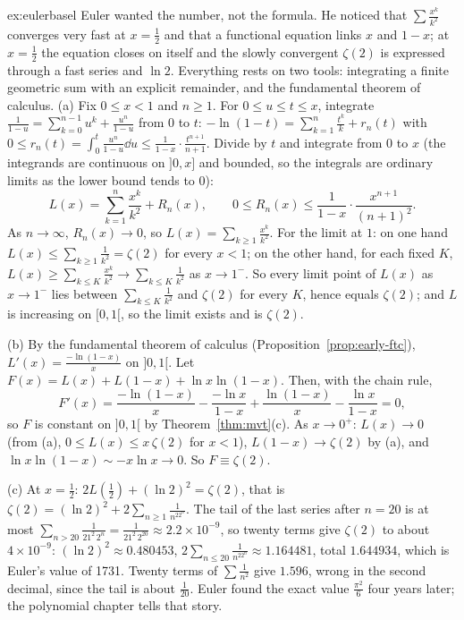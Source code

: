\begin{solution}{ex:eulerbasel}
\idea Euler wanted the number, not the formula. He noticed that $\sum\frac{x^k}{k^2}$ converges very fast at $x=\frac12$ and that a functional equation links $x$ and $1-x$; at $x=\frac12$ the equation closes on itself and the slowly convergent $\zeta(2)$ is expressed through a fast series and $\ln2$. Everything rests on two tools: integrating a finite geometric sum with an explicit remainder, and the fundamental theorem of calculus.
\writeup (a) Fix $0\le x<1$ and $n\ge1$. For $0\le u\le t\le x$, integrate $\frac1{1-u}=\sum_{k=0}^{n-1}u^k+\frac{u^n}{1-u}$ from $0$ to $t$:
$-\ln(1-t)=\sum_{k=1}^n\frac{t^k}k+r_n(t)$ with $0\le r_n(t)=\int_0^t\frac{u^n}{1-u}\dd u\le\frac1{1-x}\cdot\frac{t^{n+1}}{n+1}$.
Divide by $t$ and integrate from $0$ to $x$ (the integrands are continuous on $]0,x]$ and bounded, so the integrals are ordinary limits as the lower bound tends to $0$):
\[
L(x)=\sum_{k=1}^n\frac{x^k}{k^2}+R_n(x),\qquad0\le R_n(x)\le\frac1{1-x}\cdot\frac{x^{n+1}}{(n+1)^2}.
\]
As $n\to\infty$, $R_n(x)\to0$, so $L(x)=\sum_{k\ge1}\frac{x^k}{k^2}$. For the limit at $1$: on one hand $L(x)\le\sum_{k\ge1}\frac1{k^2}=\zeta(2)$ for every $x<1$; on the other hand, for each fixed $K$, $L(x)\ge\sum_{k\le K}\frac{x^k}{k^2}\to\sum_{k\le K}\frac1{k^2}$ as $x\to1^-$. So every limit point of $L(x)$ as $x\to1^-$ lies between $\sum_{k\le K}\frac1{k^2}$ and $\zeta(2)$ for every $K$, hence equals $\zeta(2)$; and $L$ is increasing on $[0,1[$, so the limit exists and is $\zeta(2)$.

(b) By the fundamental theorem of calculus (Proposition~\ref{prop:early-ftc}), $L'(x)=\frac{-\ln(1-x)}x$ on $]0,1[$. Let $F(x)=L(x)+L(1-x)+\ln x\ln(1-x)$. Then, with the chain rule,
\[
F'(x)=\frac{-\ln(1-x)}x-\frac{-\ln x}{1-x}+\frac{\ln(1-x)}x-\frac{\ln x}{1-x}=0,
\]
so $F$ is constant on $]0,1[$ by Theorem~\ref{thm:mvt}(c). As $x\to0^+$: $L(x)\to0$ (from (a), $0\le L(x)\le x\,\zeta(2)$ for $x<1$), $L(1-x)\to\zeta(2)$ by (a), and $\ln x\ln(1-x)\sim-x\ln x\to0$. So $F\equiv\zeta(2)$.

(c) At $x=\frac12$: $2L\left(\frac12\right)+(\ln2)^2=\zeta(2)$, that is $\zeta(2)=(\ln2)^2+2\sum_{n\ge1}\frac1{n^22^n}$. The tail of the last series after $n=20$ is at most $\sum_{n>20}\frac1{21^2\,2^n}=\frac1{21^2\,2^{20}}\approx2.2\times10^{-9}$, so twenty terms give $\zeta(2)$ to about $4\times10^{-9}$: $(\ln2)^2\approx0.480453$, $2\sum_{n\le20}\frac1{n^22^n}\approx1.164481$, total $1.644934$, which is Euler's value of 1731. Twenty terms of $\sum\frac1{n^2}$ give $1.596$, wrong in the second decimal, since the tail is about $\frac1{20}$. Euler found the exact value $\frac{\pi^2}6$ four years later; the polynomial chapter tells that story.
\end{solution}

